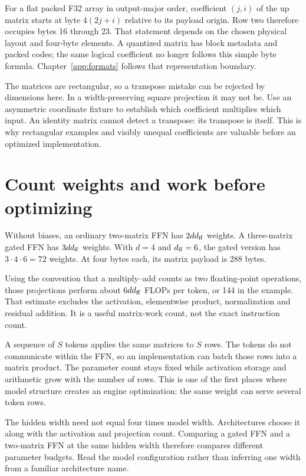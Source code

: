For a flat packed F32 array in output-major order, coefficient
$(j,i)$ of the up matrix starts at byte $4(2j+i)$ relative to its
payload origin. Row two therefore occupies bytes 16 through 23.
That statement depends on the chosen physical layout and four-byte
elements. A quantized matrix has block metadata and packed codes;
the same logical coefficient no longer follows this simple byte formula.
Chapter~\ref{app:formats} follows that representation boundary.

The matrices are rectangular, so a transpose mistake can be rejected by
dimensions here. In a width-preserving square projection it may not be.
Use an asymmetric coordinate fixture to establish which coefficient
multiplies which input. An identity matrix cannot detect a transpose:
its transpose is itself. This is why rectangular examples and visibly
unequal coefficients are valuable before an optimized implementation.

\section{Count weights and work before optimizing}
Without biases, an ordinary two-matrix FFN has $2dd_{\rm ff}$ weights.
A three-matrix gated FFN has $3dd_{\rm ff}$ weights. With $d=4$ and
$d_{\rm ff}=6$, the gated version has $3\cdot4\cdot6=72$ weights.
At four bytes each, its matrix payload is 288 bytes.

Using the convention that a multiply--add counts as two floating-point
operations, those projections perform about $6dd_{\rm ff}$ FLOPs per
token, or 144 in the example. That estimate excludes the activation,
elementwise product, normalization and residual addition. It is a useful
matrix-work count, not the exact instruction count.

A sequence of $S$ tokens applies the same matrices to $S$ rows.
The tokens do not communicate within the FFN, so an implementation can
batch those rows into a matrix product. The parameter count stays fixed
while activation storage and arithmetic grow with the number of rows.
This is one of the first places where model structure creates an engine
optimization: the same weight can serve several token rows.

The hidden width need not equal four times model width. Architectures
choose it along with the activation and projection count. Comparing a
gated FFN and a two-matrix FFN at the same hidden width therefore compares
different parameter budgets. Read the model configuration rather than
inferring one width from a familiar architecture name.

